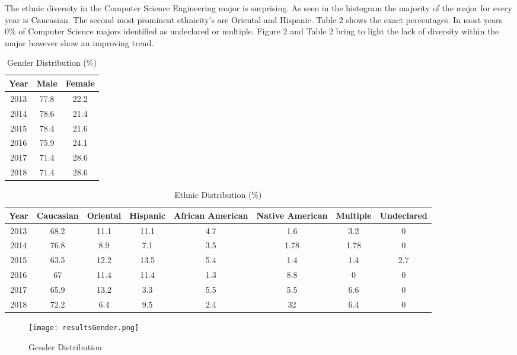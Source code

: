 \documentclass{article}
\begin{document}
    The ethnic diversity in the Computer Science Engineering major is 
surprising.  As seen in the histogram the majority of the major for 
every year is Caucasian.  The second most prominent ethnicity's are 
Oriental and Hispanic.  Table 2 shows the exact percentages.  In most 
years 0\% of Computer Science majors identified as undeclared or 
multiple.  Figure 2 and Table 2 bring to light the lack of diversity 
within the major however show an improving trend. \begin{table}[h!]
    \centering
    \begin{tabular}{|c||c|c|}\hline
     Year & Male & Female\\\hline
     2013 & 77.8 & 22.2 \\\hline
     2014 & 78.6 & 21.4\\\hline
     2015 & 78.4 & 21.6\\\hline
     2016 & 75.9 & 24.1\\\hline
     2017 & 71.4 & 28.6\\\hline
     2018 & 71.4 & 28.6\\\hline
    \end{tabular}
    \caption{Gender Distribution (\%)}
    \label{tab:my_label} \end{table} \begin{table}[h!]
    \centering
    \begin{tabular}{|c||c|c|c|c|c|c|c|}\hline
        Year & Caucasian & Oriental & Hispanic & African American & 
Native American & Multiple & Undeclared\\\hline
        2013 & 68.2&11.1&11.1&4.7&1.6&3.2&0\\\hline
        2014 & 76.8&8.9&7.1&3.5&1.78&1.78&0\\\hline
        2015 & 63.5&12.2&13.5&5.4&1.4&1.4&2.7\\\hline
        2016 & 67 & 11.4 & 11.4 & 1.3 & 8.8 & 0&0\\\hline
        2017 & 65.9& 13.2&3.3&5.5&5.5&6.6&0\\\hline
        2018 & 72.2& 6.4& 9.5 & 2.4 & 32 & 6.4& 0 \\\hline
    \end{tabular}
    \caption{Ethnic Distribution (\%)}
    \label{tab:my_label} 
    \end{table} 
    \begin{figure}[H] 
        \centering 

        \texttt{[image: resultsGender.png]} \caption{Gender 
Distribution} 
        \label{fig:gender} 
        \end{figure} 
\end{document}
